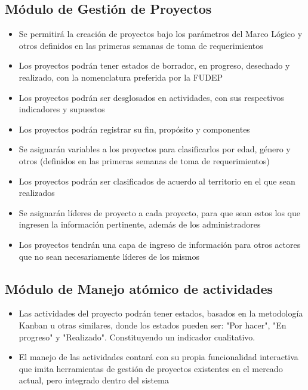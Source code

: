 \subsection{Módulo de Gestión de Proyectos}
\begin{itemize}
    \item Se permitirá la creación de proyectos bajo los parámetros del Marco Lógico y otros definidos en las primeras semanas de toma de requerimientos
    \item Los proyectos podrán tener estados de borrador, en progreso, desechado y realizado, con la nomenclatura preferida por la FUDEP
    \item Los proyectos podrán ser desglosados en actividades, con sus respectivos indicadores y supuestos
    \item Los proyectos podrán registrar su fin, propósito y componentes
    \item Se asignarán variables a los proyectos para clasificarlos por edad, género y otros (definidos en las primeras semanas de toma de requerimientos)
    \item Los proyectos podrán ser clasificados de acuerdo al territorio en el que sean realizados
    \item Se asignarán líderes de proyecto a cada proyecto, para que sean estos los que ingresen la información pertinente, además de los administradores
    \item Los proyectos tendrán una capa de ingreso de información para otros actores que no sean necesariamente líderes de los mismos
\end{itemize}

\subsection{Módulo de Manejo atómico de actividades}
\begin{itemize}
    \item Las actividades del proyecto podrán tener estados, basados en la metodología Kanban u otras similares, donde los estados pueden ser: "Por hacer", "En progreso" y "Realizado". Constituyendo un indicador cualitativo.
    \item El manejo de las actividades contará con su propia funcionalidad interactiva que imita herramientas de gestión de proyectos existentes en el mercado actual, pero integrado dentro del sistema
\end{itemize}

